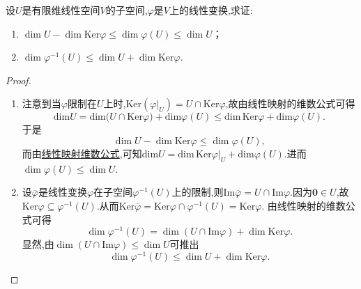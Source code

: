 \documentclass[lang=cn,newtx,10pt,scheme=chinese]{elegantbook}
\begin{document}
\begin{proposition}\label{proposition:线性变换关于子空间的维数不等式}
设\(U\)是有限维线性空间\(V\)的子空间,\(\varphi\)是\(V\)上的线性变换,求证:
\begin{enumerate}[(1)]
\item \(\dim U-\dim\text{Ker}\varphi\leq\dim\varphi(U)\leq\dim U\)；

\item \(\dim\varphi^{-1}(U)\leq\dim U+\dim\text{Ker}\varphi\).
\end{enumerate}
\end{proposition}
\begin{proof}
\begin{enumerate}[(1)]
\item 注意到当\(\varphi\)限制在\(U\)上时,\(\text{Ker}(\varphi|_U)=U\cap\text{Ker}\varphi\),故由线性映射的维数公式可得
\[
\mathrm{dim}U=\mathrm{dim(}U\cap \mathrm{Ker}\varphi )+\mathrm{dim}\varphi (U)\leqslant \mathrm{dim}\,\mathrm{Ker}\varphi +\mathrm{dim}\varphi (U).
\]
于是
\[
\dim U - \dim\text{Ker}\varphi\leq\dim\varphi(U),
\]
而由\hyperref[proposition:值域和核空间维数之和等于原像空间维数]{线性映射维数公式},可知$\mathrm{dim}U=\mathrm{dim}\,\mathrm{Ker}\varphi |_U+\mathrm{dim}\varphi (U)$.进而\(\dim\varphi(U)\leq\dim U\).

\item 设\(\overline{\varphi}\)是线性变换\(\varphi\)在子空间\(\varphi^{-1}(U)\)上的限制,则\(\text{Im}\overline{\varphi}=U\cap\text{Im}\varphi\).因为\(\boldsymbol{0}\in U\),故\(\text{Ker}\varphi\subseteq\varphi^{-1}(U)\).从而\(\text{Ker}\overline{\varphi}=\text{Ker}\varphi\cap\varphi^{-1}(U)=\text{Ker}\varphi\). 由线性映射的维数公式可得
\[
\dim\varphi^{-1}(U)=\dim(U\cap\text{Im}\varphi)+\dim\text{Ker}\varphi.
\]
显然,由\(\dim(U\cap\text{Im}\varphi)\leq\dim U\)可推出
\[
\dim\varphi^{-1}(U)\leq\dim U+\dim\text{Ker}\varphi. 
\]
\end{enumerate}
\end{proof}
\end{document}
